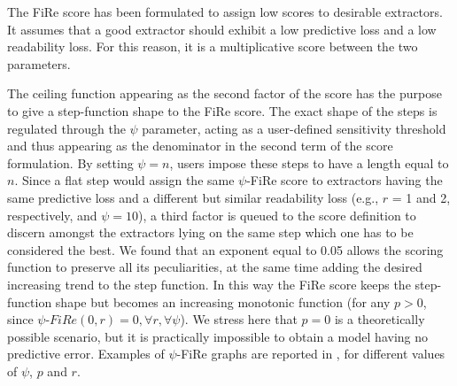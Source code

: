 \documentclass{article}
\newcommand{\fire}{FiRe}
\newcommand{\psifire}{$\psi$-\fire}
\begin{document}
The \fire{} score has been formulated to assign low scores to desirable extractors.
%
It assumes that a good extractor should exhibit a low predictive loss and a low readability loss.
%
For this reason, it is a multiplicative score between the two parameters.

The ceiling function appearing as the second factor of the score has the purpose to give a step-function shape to the \fire{} score.
%
The exact shape of the steps is regulated through the $\psi$ parameter, acting as a user-defined sensitivity threshold and thus appearing as the denominator in the second term of the score formulation.
%
By setting $\psi=n$, users impose these steps to have a length equal to $n$.
%
Since a flat step would assign the same \psifire{} score to extractors having the same predictive loss and a different but similar readability loss (e.g., $r$ = 1 and 2, respectively, and $\psi=10$), a third factor is queued to the score definition to discern amongst the extractors lying on the same step which one has to be considered the best.
%
We found that an exponent equal to 0.05 allows the scoring function to preserve all its peculiarities, at the same time adding the desired increasing trend to the step function.
%
In this way the \fire{} score keeps the step-function shape but becomes an increasing monotonic function (for any $p>0$, since $\psi\textrm{-}\fire{}(0, r)=0, \forall r, \forall \psi$).
%
We stress here that $p=0$ is a theoretically possible scenario, but it is practically impossible to obtain a model having no predictive error.
%
Examples of \psifire{} graphs are reported in , for different values of $\psi$, $p$ and $r$.

\end{document}
